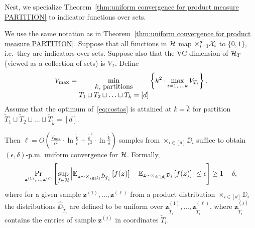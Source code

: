 Nest, we specialize Theorem~\ref{thm:uniform convergence for product measure PARTITION} to indicator functions over sets.

\begin{corollary}\label{cor:VC for product measure}
	We use the same notation as in Theorem~\ref{thm:uniform convergence for product measure PARTITION}. Suppose that all functions in ${\mathcal{H}}$ map $\times_{i=1}^{d} {\mathcal{X}}_i$ to $\{0,1\}$, i.e.~they are indicators over sets. Suppose also that the VC dimension of ${\mathcal{H}}_T$ (viewed as a collection of sets) is $V_T$. Define 
	\begin{align}V_{\max}=\min_{\begin{minipage}[h]{3.5cm}\centering $k$,~partitions\\$T_1 \sqcup T_2 \sqcup \ldots \sqcup T_k = [d]$\end{minipage}} \left\{ k^2 \cdot\max_{i=1,\ldots,k} V_{T_i}\right\}. \label{eq:costas}
	\end{align}
	Assume that the optimum of~\eqref{eq:costas} is attained at $k=\tilde{k}$ for partition $\tilde{T}_1 \sqcup \tilde{T}_2 \sqcup \ldots \sqcup \tilde{T}_{\tilde{k}} = [d]$. 
	
	Then
	$\ell = O\left(\frac{V_{\max}}{\epsilon^2}\cdot \ln \frac{\tilde{k}}{\epsilon}+\frac{\tilde{k}^2}{\epsilon^2}\cdot \ln \frac{\tilde{k}}{\delta} \right)$ samples from $\times_{i\in[d]}\DD_i$ suffice to obtain $(\epsilon,\delta)$-p.m. uniform convergence for ${\mathcal{H}}$. 
	Formally,
	$$\Pr_{\boldsymbol{z}^{(1)},\ldots, \boldsymbol{z}^{(\ell)}}\left[\sup_{f\in {\mathcal{H}}}\left|{\mathbb{E}}_{\boldsymbol{z}\sim \times_{i\in[\tilde{k}]}\hat{{\mathcal{D}}}_{\tilde{T}_i}}\left[f(\boldsymbol{z})\right] - {\mathbb{E}}_{\boldsymbol{z}\sim \times_{i\in[d]}{{\mathcal{D}}}_i}\left[f(\boldsymbol{z})\right]\right|\leq \epsilon\right]\geq 1-\delta,$$
	where for a given sample $\boldsymbol{z}^{(1)},\ldots, \boldsymbol{z}^{(\ell)}$ from a product distribution $\times_{i\in[d]} \DD_i$ the distributions $\hat{\DD}_{\tilde{T}_i}$ are defined to be uniform over ${\boldsymbol{z}}^{(1)}_{\tilde{T}_i},\ldots,{\boldsymbol{z}}^{(\ell)}_{\tilde{T}_i}$, where ${\boldsymbol{z}}^{(j)}_{\tilde{T}_i}$ contains the entries of sample $\boldsymbol{z}^{(j)}$ in coordinates $\tilde{T}_i$.
\end{corollary}

